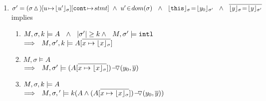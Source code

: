 \begin{lemma}
\begin{enumerate}
\begin{enumerate}

\end{enumerate}
\item
\label{l:calls:caller}
$\sigma'= (\sigma \popSymbol)[u\! \mapsto\! {\interpret {\sigma} {u'}}][\prg{cont}\!\mapsto\! stmt]\ \wedge \ u'\! \in\! dom(\sigma)\ \  \wedge\ \  
 \interpret \sigma {\prg{this}}\! =\! \interpret {\sigma'} {y_0} \ \ \wedge \ \ 
\overline{ {\interpret {\sigma} y}\!=\! {\interpret {\sigma'} y}}$\\
implies

\begin{enumerate}
\item
\label{l:calls:caller:one}
$\satDAssertFrom M  \sigma k   A \ \ \wedge\ \ \DepthSt {\sigma'} \geq k  \wedge\ \ M, \sigma' \models \intThis $ \\
$\Longrightarrow\ \  \satDAssertFrom M  {\sigma'} k   {A[\overline {x \mapsto {\interpret \sigma x}}]}$ 

\item
\label{l:calls:caller:two}
$  M , \sigma \models   A$   \\
$\Longrightarrow\ \  M , \sigma' \models  {\PushASLong  {(y_0,\overline y)}   {(A[\overline {x \mapsto {\interpret \sigma x}}])}}$

\item
\label{l:calls:caller:three}
$\satDAssertFrom M  \sigma k   A $   \\
$\Longrightarrow\ \  \satDAssertFrom M  \sigma' k    {(A \wedge \PushASLong  {(y_0,\overline y)}   {(A[\overline {x \mapsto {\interpret \sigma x}}])})}$

 \end{enumerate}
\end{enumerate}

\end{lemma}


